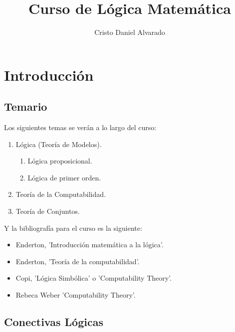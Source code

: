 \documentclass[12pt]{report}
\theoremstyle{largebreak}
\begin{document}
    \title{Curso de Lógica Matemática}
    \author{Cristo Daniel Alvarado}
    \maketitle

    \tableofcontents %

    \setcounter{chapter}{-1} %
    
    \chapter{Introducción}
    
    \section{Temario}
    

    Los siguientes temas se verán a lo largo del curso:

    \begin{enumerate}
        \item Lógica (Teoría de Modelos).
        \begin{enumerate}
            \item Lógica proposicional.
            \item Lógica de primer orden.
        \end{enumerate}
        \item Teoría de la Computabilidad.
        \item Teoría de Conjuntos.
    \end{enumerate}

    Y la bibliografía para el curso es la siguiente:

    \begin{itemize}
        \item Enderton, 'Introducción matemática a la lógica'.
        \item  Enderton, 'Teoría de la computabilidad'.
        \item Copi, 'Lógica Simbólica' o 'Computability Theory'.
        \item Rebeca Weber 'Computability Theory'.
    \end{itemize}

    \section{Conectivas Lógicas}
\end{document}
